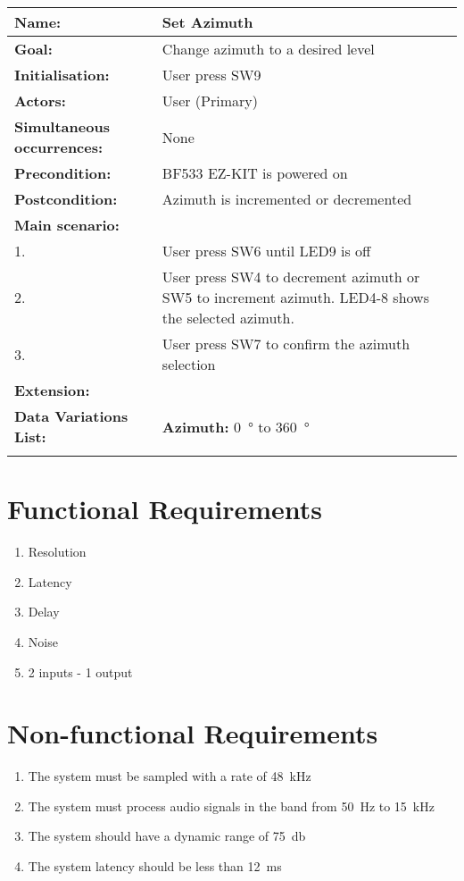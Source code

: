 \begin{longtabu}{X[0.45l] X[0.75l]}
	\textbf{Name:} &  Set Azimuth\\ %
	\midrule
	\textbf{Goal:} &  Change azimuth to a desired level\\ %
	\midrule
	\textbf{Initialisation:} &  User press SW9\\ %
	\midrule
	\textbf{Actors:} &  User (Primary)\\ %
	\midrule
	\textbf{Simultaneous occurrences:} & None \\ %
	\midrule
	\textbf{Precondition:} &  BF533 EZ-KIT is powered on\\ %
	\midrule
	\textbf{Postcondition:} &  Azimuth is incremented or decremented\\ %
	\midrule
	\bfseries{Main scenario:} & \\
	1. & User press SW6 until LED9 is off\\
	2. & User press SW4 to decrement azimuth or SW5 to increment azimuth. LED4-8 shows the selected azimuth.\\
	3. & User press SW7 to confirm the azimuth selection\\
	\midrule
	\bfseries{Extension:} & \\
	\midrule
	\bfseries{Data Variations List:} & \textbf{Azimuth:} \SI{0}{\degree} to \SI{360}{\degree} \\
	\midrule\\
\end{longtabu}

\section{Functional Requirements}
\begin{enumerate}
	\item Resolution
	\item Latency
	\item Delay
	\item Noise
	\item 2 inputs - 1 output
\end{enumerate}

\section{Non-functional Requirements}
\begin{enumerate}
	\item The system must be sampled with a rate of \SI{48}{\kilo\hertz}
	\item The system must process audio signals in the band
	from \SI{50}{\hertz} to \SI{15}{\kilo\hertz}
	\item The system should have a dynamic range of \SI{75}{\decibel}
	\item The system latency should be less than \SI{12}{\milli\second}
\end{enumerate}
